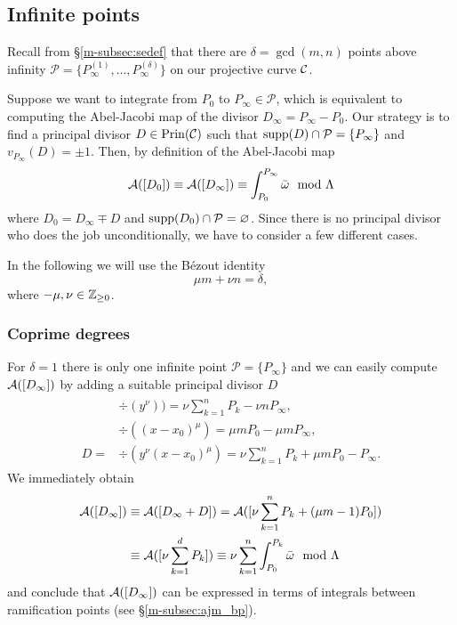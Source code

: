 \documentclass[main.tex]{subfiles}
\begin{document}
  \subsection{Infinite points}\label{subsec:ajm_infty}

  Recall from \S \ref{m-subsec:sedef} that there are $\delta = \gcd(m,n)$ points above infinity $\mathcal{P}
  = \{ P_{\infty}^{(1)},\dots, P_{\infty}^{(\delta)} \}$ on our projective curve $\mathcal{C}$.
  
  Suppose we want to integrate from $P_0$ to $P_{\infty} \in \mathcal{P}$, which is equivalent to computing the Abel-Jacobi map of the divisor
  $D_{\infty} = P_{\infty} - P_0$.
  Our strategy is to find a principal divisor $D \in \operatorname{Prin}(\mathcal{C})$ such that $\operatorname{supp}(D) \cap \mathcal{P} = \{ P_{\infty} \}$
  and $v_{P_{\infty}}(D) = \pm 1$. Then, by definition of the Abel-Jacobi map
  \begin{equation}
  \mathcal{A}([D_0]) \equiv \mathcal{A}([D_{\infty}]) \equiv \int_{P_0}^{P_{\infty}} \bar{\omega} \mod \Lambda
  \end{equation}
  where $D_0 = D_{\infty} \mp D$ and $\operatorname{supp}(D_0) \cap \mathcal{P} = \varnothing$.
  Since there is no principal divisor who does the job unconditionally, we have to consider a few different cases.
  
  In the following we will use the Bézout identity
  \begin{equation}
    \mu m + \nu n = \delta,
  \end{equation}
  where $-\mu,\nu \in \mathbb{Z}_{\ge 0}$.
  
  
  \subsubsection{Coprime degrees}
  
  For $\delta = 1$ there is only one infinite point $\mathcal{P} = \{ P_{\infty} \}$ and
  we can easily compute  $\mathcal{A}( [D_{\infty}] )$ by adding a suitable
  principal divisor $D$
    \begin{align}
     \begin{split}
      &\div(y^{\nu}) ) =  \nu \sum_{k = 1}^n P_k - \nu n P_{\infty},\\
      &\div((x-x_0)^{\mu})  =  \mu m P_0 - \mu m P_{\infty} ,\\
      D  =  & \div(y^{\nu}(x-x_0)^{\mu})  = \nu \sum_{k = 1}^n P_k + \mu m P_0 - P_{\infty}.
     \end{split}
    \end{align}
    We immediately obtain
    \begin{align}
     \mathcal{A}( [D_{\infty}] )  & \equiv  \mathcal{A}([D_{\infty} + D])  =  \mathcal{A}( [ \nu \sum_{k = 1}^n P_k + (\mu m - 1) P_0 ]  ) \\  & \equiv  \mathcal{A}( [ \nu \sum_{k = 1}^d P_k ] )
      \equiv   \nu \sum_{k=1}^n \int_{P_0}^{P_k} \bar{\omega} \mod \Lambda
    \end{align}
    and conclude that $\mathcal{A}( [D_{\infty}] )$ can be expressed in terms of integrals between
    ramification points (see \S \ref{m-subsec:ajm_bp}).
   
\end{document}
